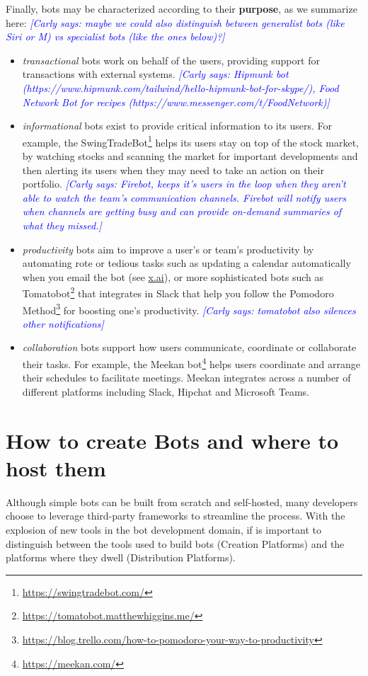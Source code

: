 \documentclass{sig-alternate}
\newcommand{\cl}[1]{\textcolor{blue}{{\it [Carly says: #1]}}}
\begin{document}
Finally, bots may be characterized according to their \textbf{purpose}, as we summarize here: 
\cl{maybe we could also distinguish between generalist bots (like Siri or M) vs specialist bots (like the ones below)?}
\begin{itemize}
\item \emph{transactional} bots work on behalf of the users, providing support for transactions with external systems.  \cl{Hipmunk bot (https://www.hipmunk.com/tailwind/hello-hipmunk-bot-for-skype/), Food Network Bot for recipes (https://www.messenger.com/t/FoodNetwork)}
\item \emph{informational} bots exist to provide critical information to its users.  For example, the SwingTradeBot\footnote{\url{https://swingtradebot.com/}} helps its users stay on top of the stock market, by watching stocks and scanning the market for important developments and then alerting its users when they may need to take an action on their portfolio. \cl{Firebot, keeps it's users in the loop when they aren't able to watch the team's communication channels.  Firebot will notify users when channels are getting busy and can provide on-demand summaries of what they missed.}
\item \emph{productivity} bots aim to improve a user's or team's productivity by automating rote or tedious tasks such as updating a calendar automatically when you email the bot (see \url{x.ai}), or more sophisticated bots such as Tomatobot\footnote{\url{https://tomatobot.matthewhiggins.me/}} that integrates in Slack that help you follow the Pomodoro Method\footnote{\url{https://blog.trello.com/how-to-pomodoro-your-way-to-productivity}} for boosting one's productivity. \cl{tomatobot also silences other notifications}
\item \emph{collaboration} bots support how users communicate, coordinate or collaborate their tasks.  For example, the Meekan bot\footnote{\url{https://meekan.com/}} helps users coordinate and arrange their schedules to facilitate meetings.  Meekan integrates across a number of different platforms including Slack, Hipchat and Microsoft Teams.
\end{itemize}
	
	
\section{How to create Bots and where to host them}

	Although simple bots can be built from scratch and self-hosted, many developers choose to leverage third-party frameworks to streamline the process. With the explosion of new tools in the bot development domain, if is important to distinguish between the tools used to build bots (Creation Platforms) and the platforms where they dwell (Distribution Platforms).
\end{document}

